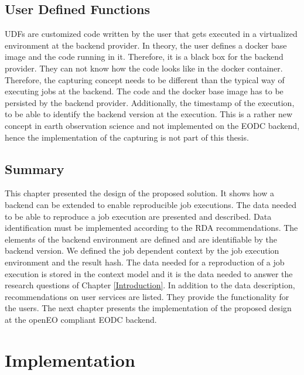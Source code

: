 \documentclass[draft,final]{vutinfth} %
\begin{document}
\section{User Defined Functions}\label{Design:User Defined Functions}
UDFs are customized code written by the user that gets executed in a virtualized environment at the backend provider. In theory, the user defines a docker base image and the code running in it. Therefore, it is a black box for the backend provider. They can not know how the code looks like in the docker container. Therefore, the capturing concept needs to be different than the typical way of executing jobs at the backend. The code and the docker base image has to be persisted by the backend provider. Additionally, the timestamp of the execution, to be able to identify the backend version at the execution. This is a rather new concept in earth observation science and not implemented on the EODC backend, hence the implementation of the capturing is not part of this thesis.

\section{Summary}
This chapter presented the design of the proposed solution. It shows how a backend can be extended to enable reproducible job executions. The data needed to be able to reproduce a job execution are presented and described. Data identification must be implemented according to the RDA recommendations. The elements of the backend environment are defined and are identifiable by the backend version. We defined the job dependent context by the job execution environment and the result hash. The data needed for a reproduction of a job execution is stored in the context model and it is the data needed to answer the research questions of Chapter \ref{Introduction}. In addition to the data description, recommendations on user services are listed. They provide the functionality for the users. The next chapter presents the implementation of the proposed design at the openEO compliant EODC backend.    

\chapter{Implementation}\label{Implementation}

\end{document}
